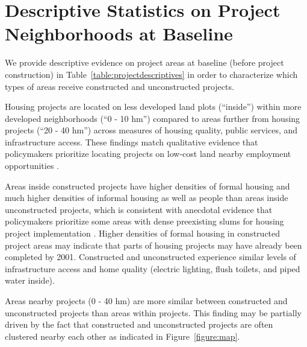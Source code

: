 \documentclass[12pt]{article}
\begin{document}





\section{Descriptive Statistics on Project Neighborhoods at Baseline}\label{section:descriptives}


We provide descriptive evidence on project areas at baseline (before project construction) in Table~\ref{table:projectdescriptives} in order to characterize which types of areas receive constructed and unconstructed projects.

Housing projects are located on less developed land plots (``inside'') within more developed neighborhoods (``0 - 10 hm'') compared to areas further from housing projects (``20 - 40 hm'') across measures of housing quality, public services, and infrastructure access.  These findings match qualitative evidence that policymakers prioritize locating projects on low-cost land nearby employment opportunities \citep{beninterview}.

Areas inside constructed projects have higher densities of formal housing and much higher densities of informal housing as well as people than areas inside unconstructed projects, which is consistent with anecdotal evidence that policymakers prioritize some areas with dense preexisting slums for housing project implementation \citep{hofmeyr2008risk}.  Higher densities of formal housing in constructed project areas may indicate that parts of housing projects may have already been completed by 2001.  Constructed and unconstructed experience similar levels of infrastructure access and home quality (electric lighting, flush toilets, and piped water inside).  

Areas nearby projects (0 - 40 hm) are more similar between constructed and unconstructed projects than areas within projects.  This finding may be partially driven by the fact that constructed and unconstructed projects are often clustered nearby each other as indicated in Figure~\ref{figure:map}.
\end{document}
